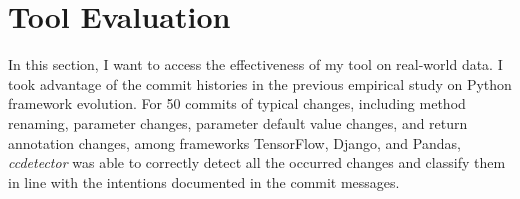 \chapter{Tool Evaluation}
\label{chap:tool-evaluation}

In this section, I want to access the effectiveness of my tool on real-world data. I took advantage of the commit histories in the previous empirical study on Python framework evolution. For 50 commits of typical changes, including method renaming, parameter changes, parameter default value changes, and return annotation changes, among frameworks TensorFlow, Django, and Pandas, \textit{ccdetector} was able to correctly detect all the occurred changes and classify them in line with the intentions documented in the commit messages.
